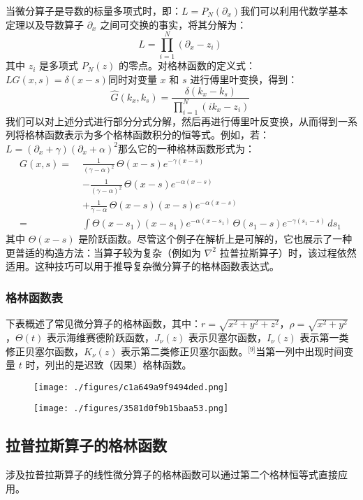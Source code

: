 当微分算子是导数的标量多项式时，即：$L = P_N(\partial_x)$我们可以利用代数学基本定理以及导数算子 $\partial_x$ 之间可交换的事实，将其分解为：
$$
L = \prod_{i=1}^{N} (\partial_x - z_i)~
$$
其中 $z_i$ 是多项式 $P_N(z)$ 的零点。对格林函数的定义式：$L G(x, s) = \delta(x - s)$同时对变量 $x$ 和 $s$ 进行傅里叶变换，得到：
$$
\widehat{G}(k_x, k_s) = \frac{\delta(k_x - k_s)}{\prod_{i=1}^{N} (ik_x - z_i)}~
$$
我们可以对上述分式进行部分分式分解，然后再进行傅里叶反变换，从而得到一系列将格林函数表示为多个格林函数积分的恒等式。例如，若：$L = (\partial_x + \gamma)(\partial_x + \alpha)^2$那么它的一种格林函数形式为：
$$
\begin{aligned}
G(x, s) =\;& \frac{1}{(\gamma - \alpha)^2} \, \Theta(x - s) e^{-\gamma(x - s)} \\
& - \frac{1}{(\gamma - \alpha)^2} \, \Theta(x - s) e^{-\alpha(x - s)} \\
& + \frac{1}{\gamma - \alpha} \, \Theta(x - s) (x - s) e^{-\alpha(x - s)} \\
=\;& \int \Theta(x - s_1)(x - s_1) e^{-\alpha(x - s_1)} \, \Theta(s_1 - s) e^{-\gamma(s_1 - s)} \, ds_1
\end{aligned}~
$$
其中 $\Theta(x - s)$ 是阶跃函数。尽管这个例子在解析上是可解的，它也展示了一种更普适的构造方法：当算子较为复杂（例如为 $\nabla^2$ 拉普拉斯算子）时，该过程依然适用。这种技巧可以用于推导复杂微分算子的格林函数表达式。
\subsubsection{格林函数表}
下表概述了常见微分算子的格林函数，其中：$r = \sqrt{x^2 + y^2 + z^2}$，$\rho = \sqrt{x^2 + y^2}$，$\Theta(t)$ 表示海维赛德阶跃函数，$J_{\nu}(z)$ 表示贝塞尔函数，$I_{\nu}(z)$ 表示第一类修正贝塞尔函数，$K_{\nu}(z)$ 表示第二类修正贝塞尔函数。\(^\text{[9]}\)当第一列中出现时间变量 $t$ 时，列出的是迟致（因果）格林函数。
\begin{figure}[ht]
\centering
\texttt{[image: ./figures/c1a649a9f9494ded.png]}
\caption{} \label{fig_GLhs_3}
\end{figure}
\begin{figure}[ht]
\centering
\texttt{[image: ./figures/3581d0f9b15baa53.png]}
\caption{} \label{fig_GLhs_2}
\end{figure}
\subsection{拉普拉斯算子的格林函数}
涉及拉普拉斯算子的线性微分算子的格林函数可以通过第二个格林恒等式直接应用。

